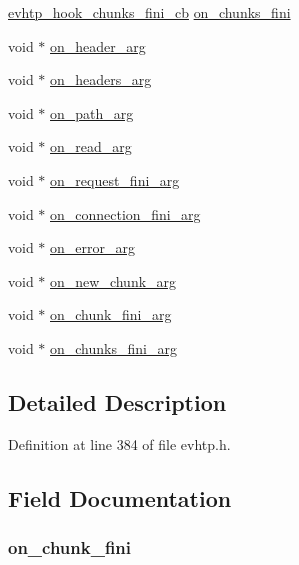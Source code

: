 \begin{DoxyCompactItemize}
\item 
\hyperlink{evhtp_8h_a29660300c43f22382a64ea48c00bf6a7}{evhtp\_\-hook\_\-chunks\_\-fini\_\-cb} \hyperlink{structevhtp__hooks__s_a0801884b636d618c7fa881668996ce4a}{on\_\-chunks\_\-fini}
\item 
void $\ast$ \hyperlink{structevhtp__hooks__s_a854ac79bb3d5399c4ed366e542eea302}{on\_\-header\_\-arg}
\item 
void $\ast$ \hyperlink{structevhtp__hooks__s_aa4ea4765f3de173070b313ee276d8a43}{on\_\-headers\_\-arg}
\item 
void $\ast$ \hyperlink{structevhtp__hooks__s_ac828d71921d79c53bd3782082a392d09}{on\_\-path\_\-arg}
\item 
void $\ast$ \hyperlink{structevhtp__hooks__s_af1ca4346719c7e3b841867e153bc7504}{on\_\-read\_\-arg}
\item 
void $\ast$ \hyperlink{structevhtp__hooks__s_a6ff6528fe6d2018c55a718ca829e00be}{on\_\-request\_\-fini\_\-arg}
\item 
void $\ast$ \hyperlink{structevhtp__hooks__s_a85b8e90c05beef54c71c79ffb3666a91}{on\_\-connection\_\-fini\_\-arg}
\item 
void $\ast$ \hyperlink{structevhtp__hooks__s_aef67e2ec495e223340f3daea5448a69a}{on\_\-error\_\-arg}
\item 
void $\ast$ \hyperlink{structevhtp__hooks__s_a4607065d4c6f3cf520d7bc1988f2dfb4}{on\_\-new\_\-chunk\_\-arg}
\item 
void $\ast$ \hyperlink{structevhtp__hooks__s_a1f6538f0edf009f607c913eaf0400a1a}{on\_\-chunk\_\-fini\_\-arg}
\item 
void $\ast$ \hyperlink{structevhtp__hooks__s_a523b6dd10fc474231833827481d802b9}{on\_\-chunks\_\-fini\_\-arg}
\end{DoxyCompactItemize}


\subsection{Detailed Description}


Definition at line 384 of file evhtp.h.



\subsection{Field Documentation}
\hypertarget{structevhtp__hooks__s_a7905e89a5d4086104635ddc867e02fe1}{
\subsubsection[{on\_\-chunk\_\-fini}]{ {\bf on\_\-chunk\_\-fini}}}
\label{structevhtp__hooks__s_a7905e89a5d4086104635ddc867e02fe1}


